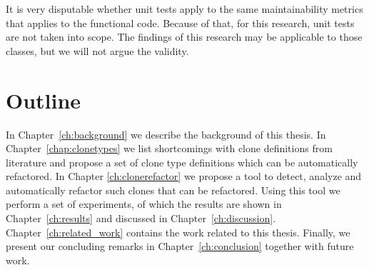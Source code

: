 It is very disputable whether unit tests apply to the same maintainability metrics that applies to the functional code. Because of that, for this research, unit tests are not taken into scope. The findings of this research may be applicable to those classes, but we will not argue the validity.

\section{Outline}
In Chapter~\ref{ch:background} we describe the background of this thesis. In Chapter~\ref{chap:clonetypes} we list shortcomings with clone definitions from literature and propose a set of clone type definitions which can be automatically refactored. %
In Chapter \ref{ch:clonerefactor} we propose a tool to detect, analyze and automatically refactor such clones that can be refactored. Using this tool we perform a set of experiments, of which the results are shown in Chapter~\ref{ch:results} and discussed in Chapter~\ref{ch:discussion}. Chapter~\ref{ch:related_work} contains the work related to this thesis. Finally, we present our concluding remarks in Chapter~\ref{ch:conclusion} together with future work.
